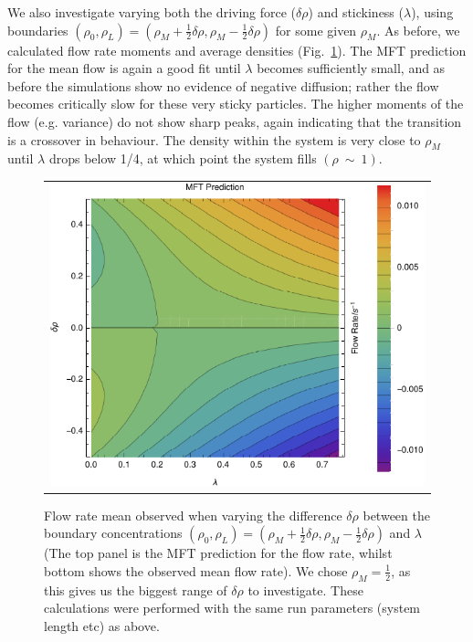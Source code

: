 \documentclass[
reprint,
 amsmath,amssymb,
 aps,
 prl
]{revtex4-1}
\begin{document}
We also investigate varying both the driving force ($\delta\rho$) and
stickiness ($\lambda$), using boundaries $(\rho_0, \rho_L) = (\rho_M +
\frac{1}{2} \delta\rho, \rho_M - \frac{1}{2} \delta\rho)$ for some
given $\rho_M$. As before, we calculated flow rate moments and average
densities (Fig.~\ref{fig:constDens}).  The MFT prediction for the mean
flow is again a good fit until $\lambda$ becomes sufficiently small,
and as before the simulations show no evidence of negative diffusion;
rather the flow becomes critically slow for these very sticky
particles.  The higher moments of the flow (e.g. variance) do not show
sharp peaks, again indicating that the transition is a crossover in behaviour.  
The density within the system is very close to $\rho_M$ 
until $\lambda$ drops below 1/4, at which point the system fills $(\rho~\sim~1)$.
\begin{figure}[h!]
\vspace{1em}
\caption{\label{fig:constDens} Flow rate mean observed when varying the difference $\delta\rho$ between the boundary concentrations
$(\rho_0, \rho_L) = (\rho_M + \frac{1}{2} \delta\rho, \rho_M - \frac{1}{2} \delta\rho)$ and $\lambda$ (The top panel is the MFT prediction
for the flow rate, whilst bottom shows the observed mean flow rate).
We chose $\rho_M=\frac{1}{2}$, as this gives us the biggest range of $\delta\rho$ to investigate.
These calculations were performed with the same run parameters (system length etc)
as above.}
\begin{center}
 \begin{tabular}{c}
    \includegraphics[width=0.98\linewidth]{newMftPred} \\

\end{tabular}
\end{center}
\end{figure}
\end{document}
